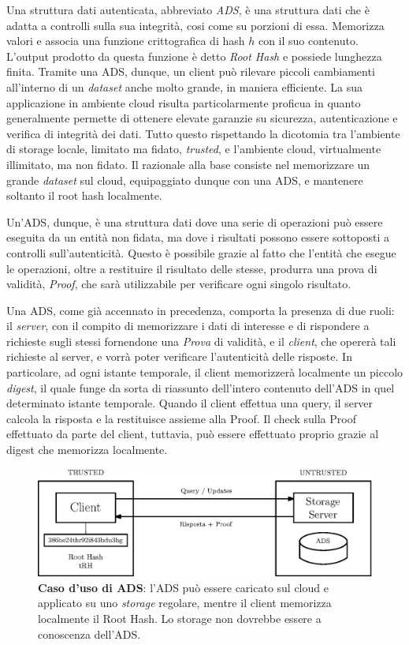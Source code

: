 		Una struttura dati autenticata, abbreviato \textit{ADS}, è una struttura dati che è adatta a controlli sulla sua integrità, cosi come su porzioni di essa. Memorizza valori e associa una funzione crittografica di hash $ h $ con il suo contenuto. L'output prodotto da questa funzione è detto \textit{Root Hash} e possiede lunghezza finita. Tramite una ADS, dunque, un client può rilevare piccoli cambiamenti all'interno di un \textit{dataset} anche molto grande, in maniera efficiente.
		La sua applicazione in ambiente cloud risulta particolarmente proficua in quanto generalmente permette di ottenere elevate garanzie su sicurezza, autenticazione e verifica di integrità dei dati. Tutto questo rispettando la dicotomia tra l'ambiente di storage locale, limitato ma fidato, \textit{trusted}, e l'ambiente cloud, virtualmente illimitato, ma non fidato. Il razionale alla base consiste nel memorizzare un grande \textit{dataset} sul cloud, equipaggiato dunque con una ADS, e mantenere soltanto il root hash localmente.

		Un'ADS, dunque, è una struttura dati dove una serie di operazioni può essere eseguita da un entità non fidata, ma dove i risultati possono essere sottoposti a controlli sull'autenticità. Questo è possibile grazie al fatto che l'entità che esegue le operazioni, oltre a restituire il risultato delle stesse, produrra una prova di validità, \textit{Proof}, che sarà utilizzabile per verificare ogni singolo risultato.

		Una ADS, come già accennato in precedenza, comporta la presenza di due ruoli: il \textit{server}, con il compito di memorizzare i dati di interesse e di rispondere a richieste sugli stessi fornendone una \textit{Prova} di validità, e il \textit{client}, che opererà tali richieste al server, e vorrà poter verificare l'autenticità delle risposte. In particolare, ad ogni istante temporale, il client memorizzerà localmente un piccolo \textit{digest}, il quale funge da sorta di riassunto dell'intero contenuto dell'ADS in quel determinato istante temporale. Quando il client effettua una query, il server calcola la risposta e la restituisce assieme alla Proof. Il check sulla Proof effettuato da parte del client, tuttavia, può essere effettuato proprio grazie al digest che memorizza localmente.
		
		\begin{figure}
			\centering
			\includegraphics[scale=0.75]{figure/trusted-untrusted.eps}
			\caption{\textbf{Caso d'uso di ADS}: l'ADS può essere caricato sul cloud e applicato su uno \textit{storage} regolare, mentre il client memorizza localmente il Root Hash. Lo storage non dovrebbe essere a conoscenza dell'ADS.}\label{fig:3}
		\end{figure}
		

